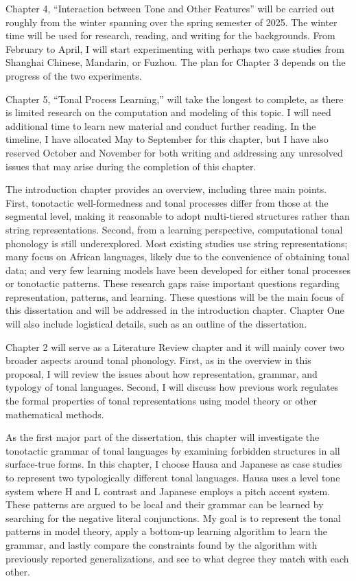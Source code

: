 Chapter 4, ``Interaction between Tone and Other Features'' will be carried out roughly from the winter spanning over the spring semester of 2025. The winter time will be used for research, reading, and writing for the backgrounds. From February to April, I will start experimenting with perhaps two case studies from Shanghai Chinese, Mandarin, or Fuzhou. The plan for Chapter 3 depends on the progress of the two experiments. 


Chapter 5, “Tonal Process Learning,” will take the longest to complete, as there is limited research on the computation and modeling of this topic. I will need additional time to learn new material and conduct further reading. In the timeline, I have allocated May to September for this chapter, but I have also reserved October and November for both writing and addressing any unresolved issues that may arise during the completion of this chapter. 

The introduction chapter provides an overview, including three main points. First, tonotactic well-formedness and tonal processes differ from those at the segmental level, making it reasonable to adopt multi-tiered structures rather than string representations. Second, from a learning perspective, computational tonal phonology is still underexplored. Most existing studies use string representations; many focus on African languages, likely due to the convenience of obtaining tonal data; and very few learning models have been developed for either tonal processes or tonotactic patterns. These research gaps raise important questions regarding representation, patterns, and learning. These questions will be the main focus of this dissertation and will be addressed in the introduction chapter. Chapter One will also include logistical details, such as an outline of the dissertation.

Chapter 2 will serve as a Literature Review chapter and it will mainly cover two broader aspects around tonal phonology. First, as in the overview in this proposal, I will review the issues about how representation, grammar, and typology of tonal languages. Second, I will discuss how previous work regulates the formal properties of tonal representations using model theory or other mathematical methods. 

As the first major part of the dissertation, this chapter will investigate the tonotactic grammar of tonal languages by examining forbidden structures in all surface-true forms. In this chapter, I choose Hausa and Japanese as case studies to represent two typologically different tonal languages. Hausa uses a level tone system where H and L contrast and Japanese employs a pitch accent system. These patterns are argued to be local and their grammar can be learned by searching for the negative literal conjunctions. My goal is to represent the tonal patterns in model theory, apply a bottom-up learning algorithm to learn the grammar, and lastly compare the constraints found by the algorithm with previously reported generalizations, and see to what degree they match with each other.  

